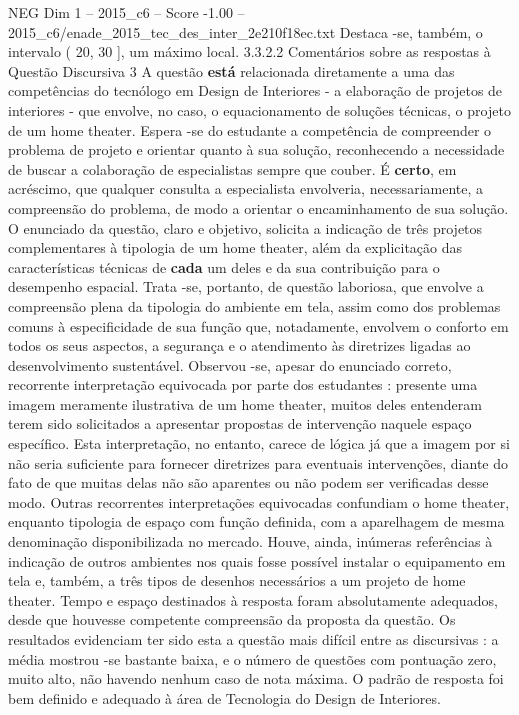\begin{textsample}{NEG Dim 1 – 2015\_c6 – Score -1.00 – 2015\_c6/enade\_2015\_tec\_des\_inter\_2e210f18ec.txt}
Destaca -se, também, o intervalo ( 20, 30 ], um máximo local. 3.3.2.2 Comentários sobre as respostas à Questão Discursiva 3 A questão \textbf{está} relacionada diretamente a uma das competências do tecnólogo em Design de Interiores - a elaboração de projetos de interiores - que envolve, no caso, o equacionamento de soluções técnicas, o projeto de um home theater.
Espera -se do estudante a competência de compreender o problema de projeto e orientar quanto à sua solução, reconhecendo a necessidade de buscar a colaboração de especialistas sempre que couber.
É \textbf{certo}, em acréscimo, que qualquer consulta a especialista envolveria, necessariamente, a compreensão do problema, de modo a orientar o encaminhamento de sua solução.
O enunciado da questão, claro e objetivo, solicita a indicação de três projetos complementares à tipologia de um home theater, além da explicitação das características técnicas de \textbf{cada} um deles e da sua contribuição para o desempenho espacial.
Trata -se, portanto, de questão laboriosa, que envolve a compreensão plena da tipologia do ambiente em tela, assim como dos problemas comuns à especificidade de sua função que, notadamente, envolvem o conforto em todos os seus aspectos, a segurança e o atendimento às diretrizes ligadas ao desenvolvimento sustentável.
Observou -se, apesar do enunciado correto, recorrente interpretação equivocada por parte dos estudantes : presente uma imagem meramente ilustrativa de um home theater, muitos deles entenderam terem sido solicitados a apresentar propostas de intervenção naquele espaço específico.
Esta interpretação, no entanto, carece de lógica já que a imagem por si não seria suficiente para fornecer diretrizes para eventuais intervenções, diante do fato de que muitas delas não são aparentes ou não podem ser verificadas desse modo.
Outras recorrentes interpretações equivocadas confundiam o home theater, enquanto tipologia de espaço com função definida, com a aparelhagem de mesma denominação disponibilizada no mercado.
Houve, ainda, inúmeras referências à indicação de outros ambientes nos quais fosse possível instalar o equipamento em tela e, também, a três tipos de desenhos necessários a um projeto de home theater.
Tempo e espaço destinados à resposta foram absolutamente adequados, desde que houvesse competente compreensão da proposta da questão.
Os resultados evidenciam ter sido esta a questão mais difícil entre as discursivas : a média mostrou -se bastante baixa, e o número de questões com pontuação zero, muito alto, não havendo nenhum caso de nota máxima.
O padrão de resposta foi bem definido e adequado à área de Tecnologia do Design de Interiores.

\end{textsample}
